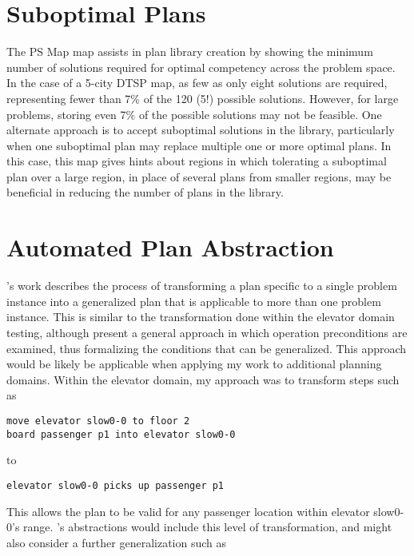 \section{Suboptimal Plans}

The PS Map map assists in plan library creation by showing the minimum number of solutions required for optimal competency across the problem space.  In the case of a 5-city DTSP map, as few as only eight solutions are required, representing fewer than 7\% of the 120 (5!) possible solutions.  However, for large problems, storing even 7\% of the possible solutions may not be feasible.  One alternate approach is to accept suboptimal solutions in the library, particularly when one suboptimal plan may replace multiple one or more optimal plans.  In this case, this map gives hints about regions in which tolerating a suboptimal plan over a large region, in place of several plans from smaller regions, may be beneficial in reducing the number of plans in the library.

\section{Automated Plan Abstraction}


\cite{srivastava08generalized}'s work describes the process of transforming a plan specific to a single problem instance into a generalized plan that is applicable to more than one problem instance.  This is similar to the transformation done within the elevator domain testing, although \citeauthor{srivastava08generalized} present a general approach in which operation preconditions are examined, thus formalizing the conditions that can be generalized.  This approach would be likely be applicable when applying my work to additional planning domains.  Within the elevator domain, my approach was to transform steps such as 

\begin{verbatim}
move elevator slow0-0 to floor 2
board passenger p1 into elevator slow0-0
\end{verbatim}

\noindent
to 

\begin{verbatim}
elevator slow0-0 picks up passenger p1
\end{verbatim}

\noindent
This allows the plan to be valid for any passenger location within elevator slow0-0's range.  \citeauthor{srivastava08generalized}'s abstractions would include this level of transformation, and might also consider a further generalization such as 

